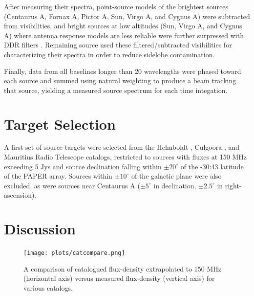 \documentclass[preprint]{aastex}
\begin{document}
After measuring their spectra, point-source models of the brightest sources (Centaurus A, Fornax A, 
Pictor A, Sun, Virgo A,
and Cygnus A) were subtracted from visibilities, and bright sources at low altitudes (Sun, Virgo A,
and Cygnus A) where antenna response models are less reliable were further surpressed with DDR 
filters \citep{parsons_backer2009}.  Remaining source used these filtered/subtracted visibilities
for characterizing their spectra in order to reduce sidelobe contamination.

Finally, data from all baselines longer than 20 wavelengths were phased toward each source
and summed using natural weighting to produce a beam tracking that source, yielding a measured
source spectrum for each time integation.

\begin{figure}\centering
\caption{
}\label{fig:skymap}
\end{figure}

\begin{figure}\centering
\caption{
}\label{fig:skymap_eq}
\end{figure}



\section{Target Selection}
\label{sec:target_selection}

A first set of source targets were selected from the Helmboldt \citep{helmboldt_et_al2008}, Culgoora \citep{slee1995}, and
Mauritius Radio Telescope \citep{golap_et_al1998} catalogs, restricted to sources with fluxes at 150 MHz 
exceeding 5 Jys and source declination 
falling within $\pm20^\circ$ of the -30:43 latitude
of the PAPER array.  Sources within $\pm10^\circ$ of the galactic plane were also excluded, as were
sources near Centaurus A ($\pm5^\circ$ in declination, $\pm2.5^\circ$ in right-ascension).


\section{Discussion}

\begin{figure}\centering
\texttt{[image: plots/catcompare.png]}
\caption{A comparison of catalogued flux-density extrapolated to 150 MHz (horizontal axis) versus 
measured flux-density (vertical axis) for various catalogs.
}\label{fig:catcompare}
\end{figure}
\end{document}

